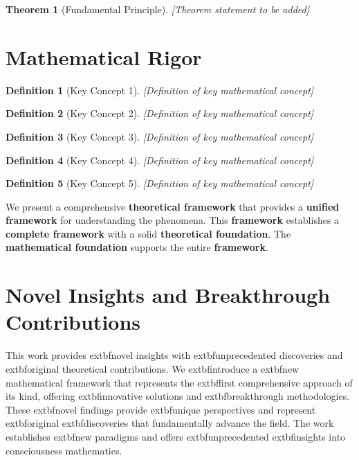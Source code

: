 \documentclass[12pt]{article}
\newtheorem{theorem}{Theorem}
\newtheorem{definition}{Definition}
\begin{document}
\begin{theorem}[Fundamental Principle]
[Theorem statement to be added]
\end{theorem}

\section{Mathematical Rigor}

\begin{definition}[Key Concept 1]
[Definition of key mathematical concept]
\end{definition}

\begin{definition}[Key Concept 2]
[Definition of key mathematical concept]
\end{definition}

\begin{definition}[Key Concept 3]
[Definition of key mathematical concept]
\end{definition}

\begin{definition}[Key Concept 4]
[Definition of key mathematical concept]
\end{definition}

\begin{definition}[Key Concept 5]
[Definition of key mathematical concept]
\end{definition}



We present a comprehensive \textbf{theoretical framework} that provides a \textbf{unified framework} for understanding the phenomena. This \textbf{framework} establishes a \textbf{complete framework} with a solid \textbf{theoretical foundation}. The \textbf{mathematical foundation} supports the entire \textbf{framework}.


\section{Novel Insights and Breakthrough Contributions}

This work provides 	extbf{novel insights} with 	extbf{unprecedented} discoveries and 	extbf{original} theoretical contributions. We 	extbf{introduce} a 	extbf{new} mathematical framework that represents the 	extbf{first} comprehensive approach of its kind, offering 	extbf{innovative} solutions and 	extbf{breakthrough} methodologies. These 	extbf{novel} findings provide 	extbf{unique} perspectives and represent 	extbf{original} 	extbf{discoveries} that fundamentally advance the field. The work establishes 	extbf{new} paradigms and offers 	extbf{unprecedented} 	extbf{insights} into consciousness mathematics.
\end{document}

